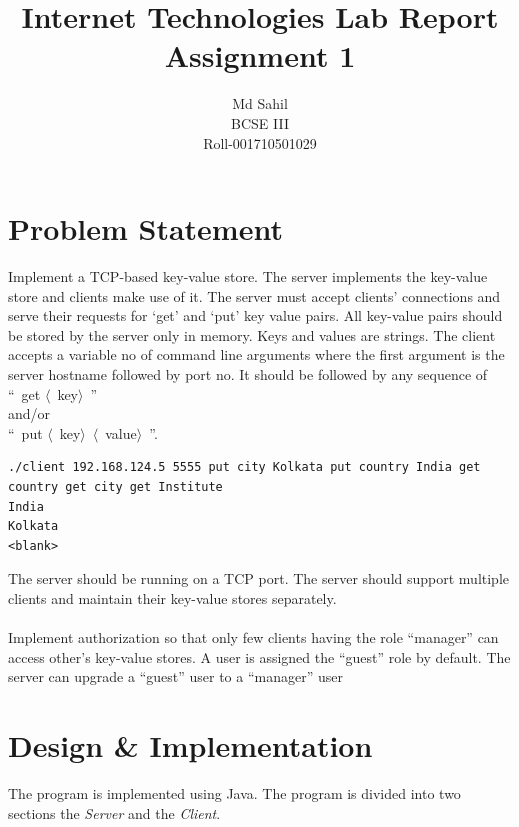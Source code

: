 \documentclass[titlepage]{article}
\title{Internet Technologies Lab Report\\Assignment 1}
\author{Md Sahil\\BCSE III\\Roll-001710501029}
\date{}
\begin{document}
    {\maketitle}

    \section{Problem Statement}
    Implement a TCP-based key-value store. 
	The server implements the key-value store and clients 
	make use of it. The server must accept clients’ connections 
	and serve their requests for ‘get’ and ‘put’ key value pairs. 
	All key-value pairs should be stored by the server only 
	in memory. Keys and values are strings. 
	The client accepts a variable no of command line arguments 
	where the first argument is the server hostname followed 
	by port no. It should be followed by any sequence 
	of\\ 
    ``~get $\langle$~key$\rangle$~''\\ 
    and/or\\ 
    ``~put $\langle$~key$\rangle$~$\langle$~value$\rangle$~''. 

    \begin{verbatim}
./client 192.168.124.5 5555 put city Kolkata put country India get country get city get Institute
India
Kolkata 
<blank> 
    \end{verbatim}

	The server should be running on a TCP port. The server should support multiple 
    clients and maintain their key-value stores separately.\\~\\
    Implement authorization so that only few clients having the role “manager” can 
    access other’s key-value stores. A user is assigned the “guest” role by default. 
    The server can upgrade a “guest” user to a “manager” user 

    \section{Design \& Implementation}
    The program is implemented using Java.
    The program is divided into two sections the \emph{Server} and the \emph{Client}.
\end{document}
